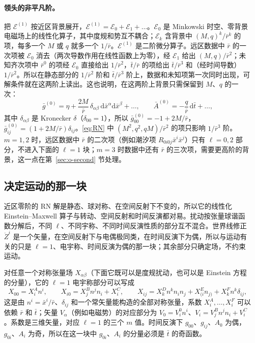 \documentclass[11pt,a4paper]{ctexart}
\newcommand{\dd}{\mathrm d}
\begin{document}
\paragraph{领头的非平凡阶。}把 $\mathcal E^{(1)}$ 按近区背景展开，$\mathcal E^{(1)}=\mathcal E_0+\mathcal E_1+\dots$。$\mathcal E_0$ 是 Minkowski 时空、零背景电磁场上的线性化算子，其中度规和势互不耦合；$\mathcal E_k$ 含背景中 $(M,q)^k/\bar r^k$ 的项，每多一个 $M$ 或 $q$ 就多一个 $1/\bar r$。$\mathcal E^{(1)}$ 是二阶微分算子。远区数据中 $\bar r$ 的一次项被 $\mathcal E_0$ 消去（两次导数作用在线性函数上为零），经 $\mathcal E_1$ 给出 $(M,q)/\bar r^2$；未知齐次项中 $\bar r^0$ 的项经 $\mathcal E_0$ 直接给出 $1/\bar r^2$，$\bar t/\bar r$ 的项给出 $\bar t/\bar r^3$ 和（经时间导数）$1/\bar r^2$。所以在静态部分的 $1/\bar r^2$ 阶和 $\bar t/\bar r^3$ 阶上，数据和未知项第一次同时出现，可解条件就在这两阶上读出。这也说明，在这两阶上背景只需保留到 $M$、$q$ 的一次：
\begin{equation}
\bar g^{(0)}=\eta+\frac{2M}{\bar r}\,\delta_{\alpha\beta}\,\dd\bar x^\alpha\dd\bar x^\beta+\dots,\qquad
\bar A^{(0)}=-\frac q{\bar r}\,\dd\bar t+\dots,
\label{eq:bgOM}
\end{equation}
其中 $\delta_{\alpha\beta}$ 是 Kronecker $\delta$（$\delta_{00}=1$），所以 $\bar g^{(0)}_{00}=-1+2M/\bar r$，$\bar g^{(0)}_{ij}=(1+2M/\bar r)\delta_{ij}$。\eqref{eq:RN} 中 $(M^2,q^2,qM)/\bar r^2$ 的项只影响 $1/\bar r^3$ 阶。$m=1,2$ 时，远区数据中 $\bar r$ 的二次项（例如潮汐项 $R_{0i0j}\bar x^i\bar x^j$）只有 $\ell=0,2$ 部分，不进入下面的 $\ell=1$ 块；$m=3$ 时数据中还有 $\bar r$ 的三次项，需要更高阶的背景，这一点在第~\ref{sec:o-second} 节处理。

\subsection{决定运动的那一块}\label{sec:struct-sym}

近区零阶的 RN 解是静态、球对称、在空间反射下不变的，所以它的线性化 Einstein--Maxwell 算子与转动、空间反射和时间反演都对易。扰动按张量球谐函数分解后，不同 $\ell$、不同宇称、不同时间反演性质的部分互不混合。世界线修正 $\ddot Z^i$ 是一个矢量，在空间反射下与电偶极同类，在时间反演下为偶，所以与运动有关的只是 $\ell=1$、电宇称、时间反演为偶的那一块；其余部分只确定场，不约束运动。

对任意一个对称张量场 $X_{\alpha\beta}$（下面它既可以是度规扰动，也可以是 Einstein 方程的分量），它的 $\ell=1$ 电宇称部分可以写成
\begin{equation}
X_{00}=X^A_in^i,\qquad X_{i0}=X^B_jn^jn_i+X^C_i,\qquad X_{ij}=X^D_kn^kn_in_j+X^E_{(i}n_{j)}+X^F_kn^k\delta_{ij},
\label{eq:harm}
\end{equation}
这是由 $n^i=\bar x^i/\bar r$、$\delta_{ij}$ 和一个常矢量能构造的全部对称张量，系数 $X^A_i,\dots,X^F_i$ 可以依赖 $\bar r$ 和 $\bar t$；矢量 $V_\alpha$（例如电磁势）的对应部分为 $V_0=V^0_in^i$、$V_i=V^B_jn^jn_i+V^C_i$。系数是三维矢量，对应 $\ell=1$ 的三个 $m$ 值。时间反演下 $g_{00}$、$g_{ij}$、$A_0$ 为偶，$g_{0i}$、$A_i$ 为奇，所以在这一块中 $g_{0i}$、$A_i$ 的分量必须是 $\bar t$ 的奇函数。
\end{document}
